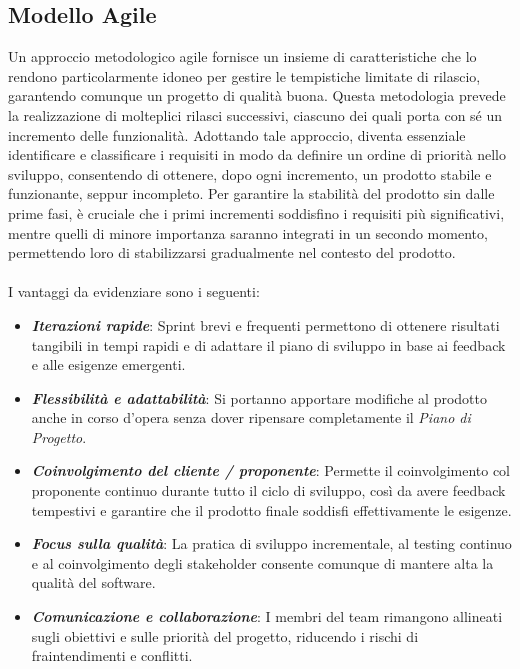 \subsection{Modello Agile}
Un approccio metodologico agile fornisce un insieme di caratteristiche che lo rendono particolarmente idoneo per gestire le tempistiche limitate di rilascio, garantendo comunque un progetto di qualità buona.
Questa metodologia prevede la realizzazione di molteplici rilasci successivi, ciascuno dei quali porta con sé un incremento delle funzionalità. Adottando tale approccio, diventa essenziale identificare e classificare i requisiti in modo da definire un ordine di priorità nello sviluppo, consentendo di ottenere, dopo ogni incremento, un prodotto stabile e funzionante, seppur incompleto. Per garantire la stabilità del prodotto sin dalle prime fasi, è cruciale che i primi incrementi soddisfino i requisiti più significativi, mentre quelli di minore importanza saranno integrati in un secondo momento, permettendo loro di stabilizzarsi gradualmente nel contesto del prodotto.
\\\\
I vantaggi da evidenziare sono i seguenti:
\begin{itemize}
\item
\textbf{\emph{Iterazioni rapide}}: Sprint brevi e frequenti permettono di ottenere risultati tangibili in tempi rapidi e di adattare il piano di sviluppo in base ai feedback e alle esigenze emergenti.
\item
\textbf{\emph{Flessibilità e adattabilità}}: Si portanno apportare modifiche al prodotto anche in corso d'opera senza dover ripensare completamente il \textit{Piano di Progetto}.
\item
\textbf{\emph{Coinvolgimento del cliente / proponente}}: Permette il coinvolgimento col proponente continuo durante tutto il ciclo di sviluppo, così da avere feedback tempestivi e garantire che il prodotto finale soddisfi effettivamente le esigenze.
\item
\textbf{\emph{Focus sulla qualità}}: La pratica di sviluppo incrementale, al testing continuo e al coinvolgimento degli stakeholder consente comunque di mantere alta la qualità del software.
\item
\textbf{\emph{Comunicazione e collaborazione}}: I membri del team rimangono allineati sugli obiettivi e sulle priorità del progetto, riducendo i rischi di fraintendimenti e conflitti.
\end{itemize}